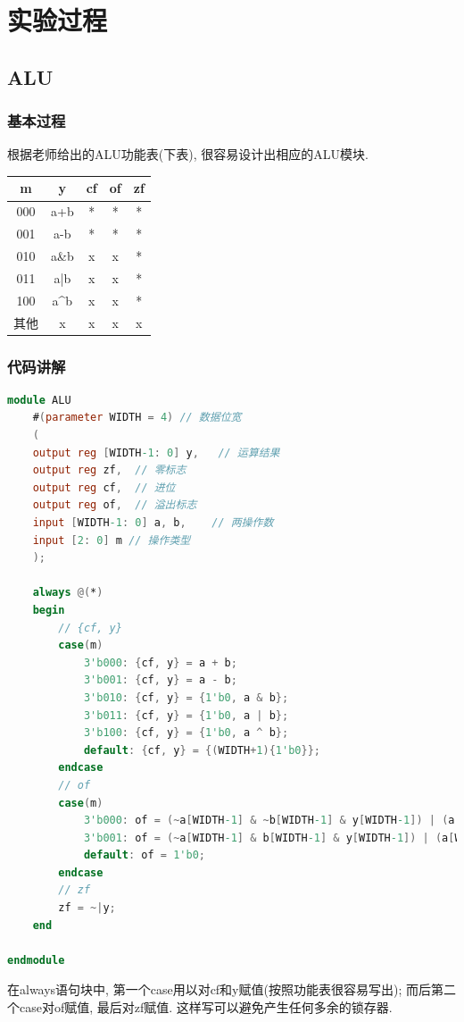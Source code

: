 \documentclass[UTF8]{article}
\newcommand{\jumpLine} {\hspace*{\fill} \par}
\begin{document}
\section{实验过程}
\subsection{ALU}
\subsubsection{基本过程}
根据老师给出的ALU功能表(下表), 很容易设计出相应的ALU模块.\par
\jumpLine
\begin{center}
	\begin{tabular}{c|c|c|c|c}
		\hline
		m & y & cf & of & zf \\
		\hline
		000 & a+b & * & * & * \\
		\hline
		001 & a-b & * & * & * \\
		\hline
		010 & a\&b & x & x & * \\
		\hline
		011 & a|b & x & x & * \\
		\hline
		100 & a\^{}b & x & x & * \\
		\hline
		其他 & x & x & x & x \\
		\hline
	\end{tabular}
\end{center}
\subsubsection{代码讲解}
\begin{lstlisting}[language=verilog]
module ALU 
    #(parameter WIDTH = 4) // 数据位宽
    (
    output reg [WIDTH-1: 0] y,   // 运算结果
    output reg zf,  // 零标志
    output reg cf,  // 进位
    output reg of,  // 溢出标志
    input [WIDTH-1: 0] a, b,    // 两操作数
    input [2: 0] m // 操作类型
    );
    
    always @(*)
    begin
        // {cf, y}
        case(m)
            3'b000: {cf, y} = a + b;
            3'b001: {cf, y} = a - b;
            3'b010: {cf, y} = {1'b0, a & b};
            3'b011: {cf, y} = {1'b0, a | b};
            3'b100: {cf, y} = {1'b0, a ^ b};
            default: {cf, y} = {(WIDTH+1){1'b0}};
        endcase
        // of
        case(m)
            3'b000: of = (~a[WIDTH-1] & ~b[WIDTH-1] & y[WIDTH-1]) | (a[WIDTH-1] & b[WIDTH-1] & ~y[WIDTH-1]);
            3'b001: of = (~a[WIDTH-1] & b[WIDTH-1] & y[WIDTH-1]) | (a[WIDTH-1] & ~b[WIDTH-1] & ~y[WIDTH-1]);
            default: of = 1'b0;
        endcase
        // zf
        zf = ~|y;
    end
    
endmodule
\end{lstlisting}
在always语句块中, 第一个case用以对cf和y赋值(按照功能表很容易写出); 而后第二个case对of赋值, 最后对zf赋值.
这样写可以避免产生任何多余的锁存器.
\end{document}
